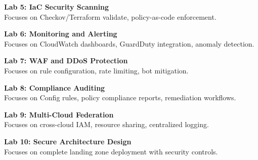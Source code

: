 \noindent\textbf{Lab 5: IaC Security Scanning} \\
Focuses on Checkov/Terraform validate, policy-as-code enforcement.

\vspace{0.2cm}

\noindent\textbf{Lab 6: Monitoring and Alerting} \\
Focuses on CloudWatch dashboards, GuardDuty integration, anomaly detection.

\vspace{0.2cm}

\noindent\textbf{Lab 7: WAF and DDoS Protection} \\
Focuses on rule configuration, rate limiting, bot mitigation.

\vspace{0.2cm}

\noindent\textbf{Lab 8: Compliance Auditing} \\
Focuses on Config rules, policy compliance reports, remediation workflows.

\vspace{0.2cm}

\noindent\textbf{Lab 9: Multi-Cloud Federation} \\
Focuses on cross-cloud IAM, resource sharing, centralized logging.

\vspace{0.2cm}

\noindent\textbf{Lab 10: Secure Architecture Design} \\
Focuses on complete landing zone deployment with security controls.

\vspace{0.2cm}

\newpage
{}
